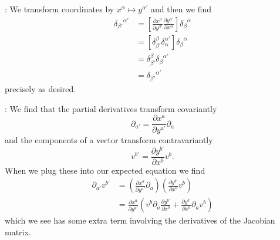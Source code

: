 :
 We transform coordinates by $x^{\alpha }\mapsto y^{\alpha '}$ and then we find \begin {subequations} \begin {align} {\delta _{\beta '}}^{\alpha '} &= \left [\frac {\partial x^{\beta }}{\partial y^{\beta '}}\frac {\partial y^{\alpha '}}{\partial x^{\alpha }}\right ]{\delta _{\beta }}^{\alpha }\\ &= \left [\delta ^{\beta }_{\beta '}\delta ^{\alpha '}_{\alpha }\right ]{\delta _{\beta }}^{\alpha }\\ &= \delta ^{\beta }_{\beta '}{\delta _{\beta }}^{\alpha '}\\ &= {\delta _{\beta '}}^{\alpha '} \end {align} \end {subequations} precisely as desired.

:
 We find that the partial derivatives transform covariantly \begin {equation}\partial _{a'} = \frac {\partial x^{a}}{\partial y^{a'}}\partial _{a} \end {equation} and the components of a vector transform contravariantly \begin {equation}v^{b'} = \frac {\partial y^{b'}}{\partial x^{b}}v^{b}. \end {equation} When we plug these into our expected equation we find \begin {subequations} \begin {align} \partial _{a'}v^{b'} &= \left (\frac {\partial x^{a}}{\partial y^{a'}}\partial _{a}\right )\left (\frac {\partial y^{b'}}{\partial x^{b}}v^{b}\right )\\ &= \frac {\partial x^{a}}{\partial y^{a'}}\left (v^{b}\partial _{a}\frac {\partial y^{b'}}{\partial x^{b}} + \frac {\partial y^{b'}}{\partial x^{b}}\partial _{a}v^{b}\right ) \end {align} \end {subequations} which we see has some extra term involving the derivatives of the Jacobian matrix.

